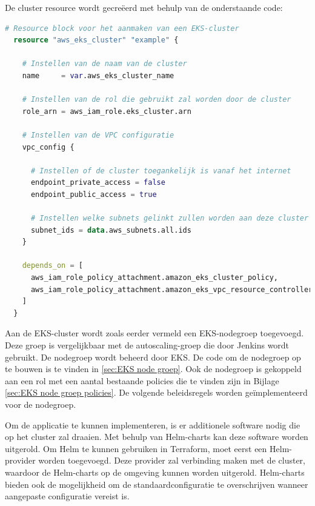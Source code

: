 De cluster resource wordt gecreëerd met behulp van de onderstaande code:
\newline

\begin{lstlisting}[language=terraform]
  # Resource block voor het aanmaken van een EKS-cluster
  resource "aws_eks_cluster" "example" {
  
    # Instellen van de naam van de cluster
    name     = var.aws_eks_cluster_name
  
    # Instellen van de rol die gebruikt zal worden door de cluster
    role_arn = aws_iam_role.eks_cluster.arn
  
    # Instellen van de VPC configuratie
    vpc_config {
  
      # Instellen of de cluster toegankelijk is vanaf het internet
      endpoint_private_access = false
      endpoint_public_access = true
  
      # Instellen welke subnets gelinkt zullen worden aan deze cluster
      subnet_ids = data.aws_subnets.all.ids
    }
  
    depends_on = [
      aws_iam_role_policy_attachment.amazon_eks_cluster_policy,
      aws_iam_role_policy_attachment.amazon_eks_vpc_resource_controller,
    ]
  }
\end{lstlisting}

\vspace{0.5cm}
Aan de EKS-cluster wordt zoals eerder vermeld een EKS-nodegroep toegevoegd. Deze groep is vergelijkbaar met de autoscaling-groep die door Jenkins wordt gebruikt. De nodegroep wordt beheerd door EKS. De code om de nodegroep op te bouwen is te vinden in \ref{sec:EKS node groep}. Ook de nodegroep is gekoppeld aan een rol met een aantal bestaande policies die te vinden zijn in Bijlage \ref{sec:EKS node groep policies}. De volgende beleidsregels worden geïmplementeerd voor de nodegroep.
\newline

Om de applicatie te kunnen implementeren, is er additionele software nodig die op het cluster zal draaien. Met behulp van Helm-charts kan deze software worden uitgerold. Om Helm te kunnen gebruiken in Terraform, moet eerst een Helm-provider worden toegevoegd. Deze provider zal verbinding maken met de cluster, waardoor de Helm-charts op de omgeving kunnen worden uitgerold. Helm-charts bieden ook de mogelijkheid om de standaardconfiguratie te overschrijven wanneer aangepaste configuratie vereist is.
\newline

